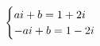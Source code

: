 \documentclass[preview]{standalone}
\begin{document}
\begin{align*}
\special{dvisvgm:raw <g id='unique000'>}\begin{cases}ai+b=1+2i\\-ai+b=1-2i\end{cases}\special{dvisvgm:raw </g>}
\end{align*}
\end{document}
